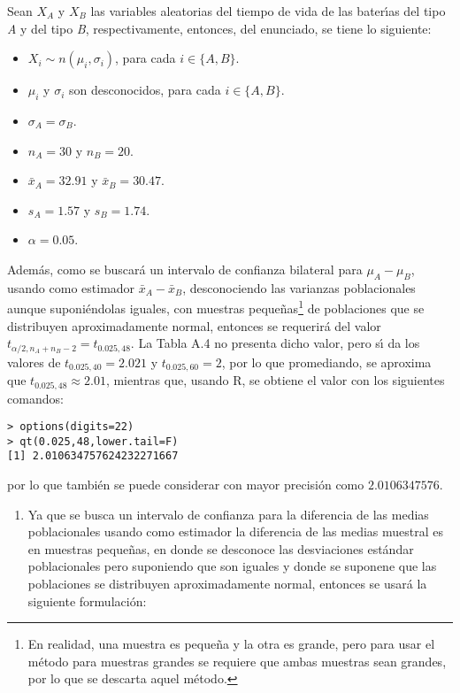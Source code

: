\begin{solucion}
 Sean $X_A$ y $X_B$ las variables aleatorias del tiempo de vida de las bater\'{\i}as del tipo \textit{A} y del tipo \textit{B}, respectivamente, entonces, del enunciado, se tiene lo siguiente:
 \begin{itemize}
  \item $X_i \sim n\left( \mu_i , \sigma_i \right)$, para cada $i \in \{ A, B \}$.
  \item $\mu_i$ y $\sigma_i$ son desconocidos, para cada $i \in \{ A, B \}$.
  \item $\sigma_A = \sigma_B$.
  \item $n_A = 30$ y $n_B = 20$.
  \item $\bar{x}_A = 32.91$ y $\bar{x}_B = 30.47$.
  \item $s_A = 1.57$ y $s_B = 1.74$.
  \item $\alpha = 0.05$.
 \end{itemize}
 Adem\'as, como se buscar\'a un intervalo de confianza bilateral para $\mu_A - \mu_B$, usando como estimador $\bar{x}_A - \bar{x}_B$, desconociendo las varianzas poblacionales aunque suponi\'endolas iguales, con muestras peque\~nas\footnote{En realidad, una muestra es peque\~na y la otra es grande, pero para usar el m\'etodo para muestras grandes se requiere que ambas muestras sean grandes, por lo que se descarta aquel m\'etodo.} de poblaciones que se distribuyen aproximadamente normal, entonces se requerir\'a del valor $t_{\alpha/2,n_A+n_B-2} = t_{0.025,48}$. La Tabla A.4 no presenta dicho valor, pero s\'{\i} da los valores de $t_{0.025,40} = 2.021$ y $t_{0.025,60} = 2$, por lo que promediando, se aproxima que $t_{0.025,48} \approx 2.01$, mientras que, usando R, se obtiene el valor con los siguientes comandos:
 \begin{verbatim}
> options(digits=22)
> qt(0.025,48,lower.tail=F)
[1] 2.010634757624232271667
 \end{verbatim}
 \vspace{-0.5cm}
 por lo que tambi\'en se puede considerar con mayor precisi\'on como $2.0106347576$.
 \begin{enumerate}
  \item Ya que se busca un intervalo de confianza para la diferencia de las medias poblacionales usando como estimador la diferencia de las medias muestral es en muestras peque\~nas, en donde se desconoce las desviaciones est\'andar poblacionales pero suponiendo que son iguales y donde se suponene que las poblaciones se distribuyen aproximadamente normal, entonces se usar\'a la siguiente formulaci\'on:

\end{enumerate}
\end{solucion}
